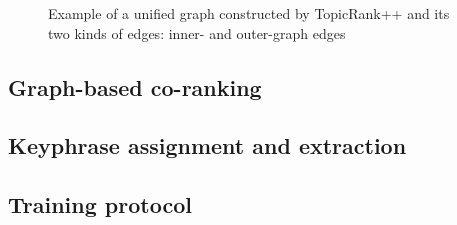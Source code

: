 \begin{figure*}
      \caption{Example of a unified graph constructed by TopicRank++ and its two
               kinds of edges: inner- and outer-graph edges
               \label{fig:topicrankpp_graph}}
    \end{figure*}

  \subsection{Graph-based co-ranking}
  \label{subsec:graph_based_co_ranking}

  \subsection{Keyphrase assignment and extraction}
  \label{subsec:keyphrase_assignment_and_extraction}

  \subsection{Training protocol}
  \label{subsec:training_protocol}

